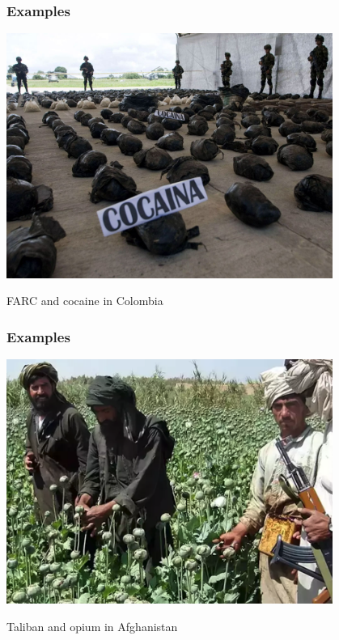 \documentclass[aspectratio=43]{beamer}
\begin{document}
\begin{frame}
\frametitle{Examples}
\centering

\includegraphics[width = 0.8\textwidth]{img/farc}

FARC and cocaine in Colombia

\end{frame}

\begin{frame}
\frametitle{Examples}
\centering

\includegraphics[width = 0.8\textwidth]{img/taliban}

Taliban and opium in Afghanistan

\end{frame}
\end{document}
